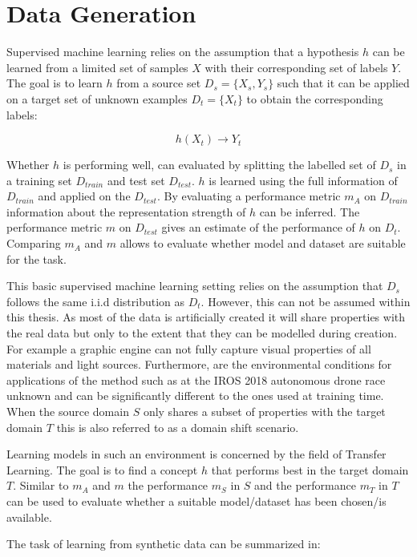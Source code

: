 \chapter{Data Generation}
\label{sec:training}

Supervised machine learning relies on the assumption that a hypothesis $h$ can be learned from a limited set of samples $X$ with their corresponding set of labels $Y$. The goal is to learn $h$ from a source set $D_s = \{X_{s},Y_{s}\}$ such that it can be applied on a target set of unknown examples $D_t = \{X_{t}\}$ to obtain the corresponding labels:

$$
h(X_t)\rightarrow Y_t
$$ 

Whether $h$ is performing well, can evaluated by splitting the labelled set of $D_s$ in a training set $D_{train}$ and test set $D_{test}$. $h$ is learned using the full information of $D_{train}$ and applied on the $D_{test}$. By evaluating a performance metric $m_A$ on $D_{train}$ information about the representation strength of $h$ can be inferred. The performance metric $m$ on $D_{test}$ gives an estimate of the performance of $h$ on $D_t$. Comparing $m_A$ and $m$ allows to evaluate whether model and dataset are suitable for the task.
			
This basic supervised machine learning setting relies on the assumption that $D_s$ follows the same i.i.d distribution as $D_t$. However, this can not be assumed within this thesis. As most of the data is artificially created it will share properties with the real data but only to the extent that they can be modelled during creation. For example a graphic engine can not fully capture visual properties of all materials and light sources. Furthermore, are the environmental conditions for applications of the method such as at the IROS 2018 autonomous drone race unknown and can be significantly different to the ones used at training time. When the source domain $S$ only shares a subset of properties with the target domain $T$ this is also referred to as a domain shift scenario. 

Learning models in such an environment is concerned by the field of Transfer Learning. The goal is to find a concept $h$ that performs best in the target domain $T$. Similar to $m_A$ and $m$ the performance $m_S$ in $S$ and the performance $m_T$ in $T$ can be used to evaluate whether a suitable model/dataset has been chosen/is available.

The task of learning from synthetic data can be summarized in:

